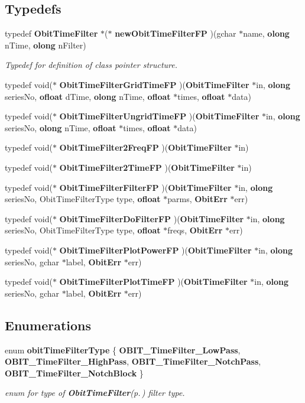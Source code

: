 \subsection*{Typedefs}
\begin{CompactItemize}
\item 
typedef {\bf Obit\-Time\-Filter} $\ast$($\ast$ {\bf new\-Obit\-Time\-Filter\-FP} )(gchar $\ast$name, {\bf olong} n\-Time, {\bf olong} n\-Filter)
\begin{CompactList}\small\item\em Typedef for definition of class pointer structure. \item\end{CompactList}\item 
typedef void($\ast$ {\bf Obit\-Time\-Filter\-Grid\-Time\-FP} )({\bf Obit\-Time\-Filter} $\ast$in, {\bf olong} series\-No, {\bf ofloat} d\-Time, {\bf olong} n\-Time, {\bf ofloat} $\ast$times, {\bf ofloat} $\ast$data)
\item 
typedef void($\ast$ {\bf Obit\-Time\-Filter\-Ungrid\-Time\-FP} )({\bf Obit\-Time\-Filter} $\ast$in, {\bf olong} series\-No, {\bf olong} n\-Time, {\bf ofloat} $\ast$times, {\bf ofloat} $\ast$data)
\item 
typedef void($\ast$ {\bf Obit\-Time\-Filter2Freq\-FP} )({\bf Obit\-Time\-Filter} $\ast$in)
\item 
typedef void($\ast$ {\bf Obit\-Time\-Filter2Time\-FP} )({\bf Obit\-Time\-Filter} $\ast$in)
\item 
typedef void($\ast$ {\bf Obit\-Time\-Filter\-Filter\-FP} )({\bf Obit\-Time\-Filter} $\ast$in, {\bf olong} series\-No, Obit\-Time\-Filter\-Type type, {\bf ofloat} $\ast$parms, {\bf Obit\-Err} $\ast$err)
\item 
typedef void($\ast$ {\bf Obit\-Time\-Filter\-Do\-Filter\-FP} )({\bf Obit\-Time\-Filter} $\ast$in, {\bf olong} series\-No, Obit\-Time\-Filter\-Type type, {\bf ofloat} $\ast$freqs, {\bf Obit\-Err} $\ast$err)
\item 
typedef void($\ast$ {\bf Obit\-Time\-Filter\-Plot\-Power\-FP} )({\bf Obit\-Time\-Filter} $\ast$in, {\bf olong} series\-No, gchar $\ast$label, {\bf Obit\-Err} $\ast$err)
\item 
typedef void($\ast$ {\bf Obit\-Time\-Filter\-Plot\-Time\-FP} )({\bf Obit\-Time\-Filter} $\ast$in, {\bf olong} series\-No, gchar $\ast$label, {\bf Obit\-Err} $\ast$err)
\end{CompactItemize}
\subsection*{Enumerations}
\begin{CompactItemize}
\item 
enum {\bf obit\-Time\-Filter\-Type} \{ {\bf OBIT\_\-Time\-Filter\_\-Low\-Pass}, 
{\bf OBIT\_\-Time\-Filter\_\-High\-Pass}, 
{\bf OBIT\_\-Time\-Filter\_\-Notch\-Pass}, 
{\bf OBIT\_\-Time\-Filter\_\-Notch\-Block}
 \}
\begin{CompactList}\small\item\em enum for type of {\bf Obit\-Time\-Filter}{\rm (p.\,\pageref{structObitTimeFilter})} filter type. \item\end{CompactList}\end{CompactItemize}
